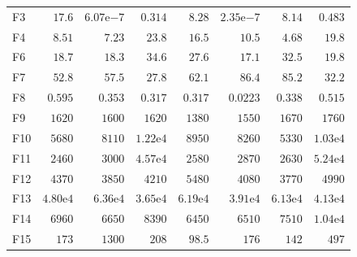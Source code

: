 \begin{tabular}{lrrrrrrr}
F3 & $17.6$ & $6.07\mathrm{e}{-7}$ & $0.314$ & $8.28$ & $2.35\mathrm{e}{-7}$ & $8.14$ & $0.483$ \\
F4 & $8.51$ & $7.23$ & $23.8$ & $16.5$ & $10.5$ & $4.68$ & $19.8$ \\
F6 & $18.7$ & $18.3$ & $34.6$ & $27.6$ & $17.1$ & $32.5$ & $19.8$ \\
F7 & $52.8$ & $57.5$ & $27.8$ & $62.1$ & $86.4$ & $85.2$ & $32.2$ \\
F8 & $0.595$ & $0.353$ & $0.317$ & $0.317$ & $0.0223$ & $0.338$ & $0.515$ \\
F9 & $1620$ & $1600$ & $1620$ & $1380$ & $1550$ & $1670$ & $1760$ \\
F10 & $5680$ & $8110$ & $1.22\mathrm{e}{4}$ & $8950$ & $8260$ & $5330$ & $1.03\mathrm{e}{4}$ \\
F11 & $2460$ & $3000$ & $4.57\mathrm{e}{4}$ & $2580$ & $2870$ & $2630$ & $5.24\mathrm{e}{4}$ \\
F12 & $4370$ & $3850$ & $4210$ & $5480$ & $4080$ & $3770$ & $4990$ \\
F13 & $4.80\mathrm{e}{4}$ & $6.36\mathrm{e}{4}$ & $3.65\mathrm{e}{4}$ & $6.19\mathrm{e}{4}$ & $3.91\mathrm{e}{4}$ & $6.13\mathrm{e}{4}$ & $4.13\mathrm{e}{4}$ \\
F14 & $6960$ & $6650$ & $8390$ & $6450$ & $6510$ & $7510$ & $1.04\mathrm{e}{4}$ \\
F15 & $173$ & $1300$ & $208$ & $98.5$ & $176$ & $142$ & $497$ \\
\bottomrule
\end{tabular}
